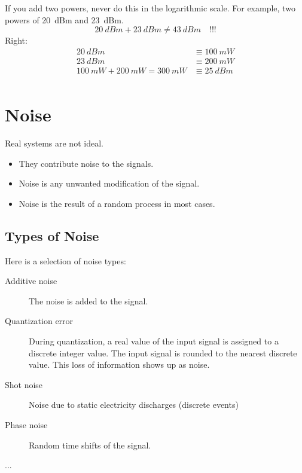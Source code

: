 \begin{refsection}
\begin{attention}
	If you add two powers, never do this in the logarithmic scale. For example, two powers of \SI{20}{dBm} and \SI{23}{dBm}.
	\begin{equation*}
		\SI{20}{dBm} + \SI{23}{dBm} \neq \SI{43}{dBm} \quad \text{!!!}
	\end{equation*}
	Right:
	\begin{equation*}
		\begin{split}
			\SI{20}{dBm} &\equiv \SI{100}{mW} \\
			\SI{23}{dBm} &\equiv \SI{200}{mW} \\
			\SI{100}{mW} + \SI{200}{mW} = \SI{300}{mW} &\equiv \SI{25}{dBm} \\
		\end{split}
	\end{equation*}
\end{attention}

\section{Noise}

Real systems are not ideal.
\begin{itemize}
	\item They contribute noise to the signals.
	\item Noise is any unwanted modification of the signal.
	\item Noise is the result of a random process in most cases.
\end{itemize} 

\subsection{Types of Noise}

Here is a selection of  noise types:
\begin{description}
	\item[Additive noise] The noise is added to the signal.
	\item[Quantization error] During quantization, a real value of the input signal is assigned to a discrete integer value. The input signal is rounded to the nearest discrete value. This loss of information shows up as noise.
	\item[Shot noise] Noise due to static electricity discharges (discrete events)
	\item[Phase noise] Random time shifts of the signal.
	\item[...]
\end{description}


\end{refsection}
